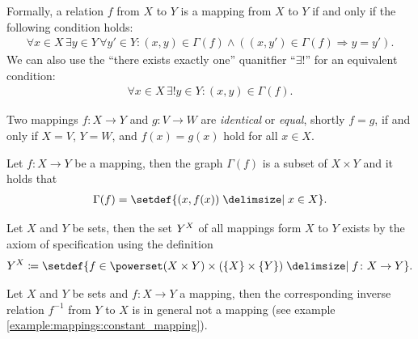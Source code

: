 \begin{remarks}
    \begin{remarkenumerate}
        \item Formally, a relation $f$ from $X$ to $Y$ is a mapping from $X$ to $Y$ if and only if the following condition holds:
        \begin{align}\forall x\in X\, \exists y\in Y\, \forall y'\in Y\colon (x,y)\in\Gamma(f)\land ((x,y')\in\Gamma(f)\Rightarrow y=y').\end{align}
        We can also use the \enquote{there exists exactly one} quanitfier \enquote{$\exists!$} for an equivalent condition:
        \begin{align}\forall x\in X\, \exists! y\in Y\colon (x,y)\in\Gamma(f).\end{align}

        \item Two mappings $f\colon X\rightarrow Y$ and $g\colon V\rightarrow W$ are \emph{identical} or \emph{equal}, shortly $f=g$, if and only if $X=V$, $Y=W$, and $f(x)=g(x)$ hold for all $x\in X$.
        
        \item Let $f\colon X\rightarrow Y$ be a mapping, then the graph $\Gamma(f)$ is a subset of $X\times Y$ and it holds that
        \begin{align}\Gamma(f)=\setdef{(x,f(x))\given x\in X}.\end{align}

        \item Let $X$ and $Y$ be sets, then the set $\mapset X Y$ of all mappings form $X$ to $Y$ exists by the axiom of specification using the definition \begin{align}\mapset X Y\coloneq\setdef{f\in\powerset(X\times Y)\times (\{X\}\times\{Y\})\given f\colon X\rightarrow Y}.\end{align}
        
        \item Let $X$ and $Y$ be sets and $f\colon X\rightarrow Y$ a mapping, then the corresponding inverse relation $f^{-1}$ from $Y$ to $X$ is in general not a mapping (see example \ref{example:mappings:constant_mapping}).
    \end{remarkenumerate}
\end{remarks}

